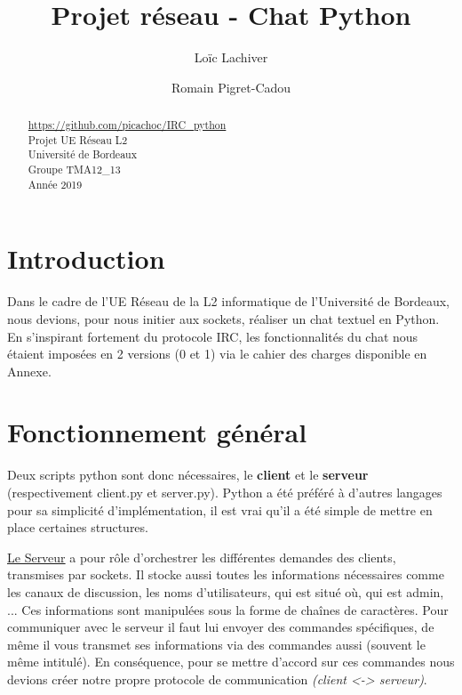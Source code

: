 \documentclass[12pt]{article}
\title{Projet réseau - Chat Python}
\author{Loïc Lachiver \and Romain Pigret-Cadou}
\begin{document}
\maketitle


\begin{abstract}
    \begin{center}
    \url{https://github.com/picachoc/IRC_python}
    \\Projet UE Réseau L2
    \\Université de Bordeaux
    \\Groupe TMA12\_13
    \\Année 2019
    \end{center}
\end{abstract}


\tableofcontents



\section{Introduction}
Dans le cadre de l'UE Réseau de la L2 informatique de l'Université de Bordeaux,
nous devions, pour nous initier aux sockets, réaliser un chat textuel en Python.
En s'inspirant fortement du protocole IRC, les fonctionnalités du chat nous étaient
imposées en 2 versions (0 et 1) via le cahier des charges disponible en Annexe.

\section{Fonctionnement général}

Deux scripts python sont donc nécessaires, le \textbf{client} et
le \textbf{serveur} (respectivement
client.py et server.py). Python a été préféré à d'autres langages pour sa simplicité
d'implémentation, il est vrai qu'il a été simple de mettre en place
certaines structures.

\underline{Le Serveur} a pour rôle d'orchestrer les différentes demandes des clients,
transmises par sockets. Il stocke aussi toutes les informations nécessaires comme
les canaux de discussion, les noms d'utilisateurs, qui est situé où, qui est admin, ...
Ces informations sont manipulées sous la forme de chaînes de caractères.
Pour communiquer avec le serveur il faut lui envoyer des commandes spécifiques,
de même il vous transmet ses informations via des commandes aussi (souvent le même intitulé).
En conséquence, pour se mettre d'accord sur ces commandes nous devions créer notre propre
protocole de communication \emph{(client <-> serveur)}.
\end{document}
